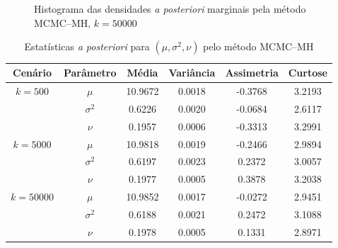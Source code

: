 \documentclass[9pt]{beamer}
\begin{document}
\begin{frame}
\begin{figure}[t]
\caption{Histograma das densidades \textit{a posteriori} marginais pela método MCMC--MH, $k = 50000$}%
\end{figure}
\end{frame}
\begin{frame}
\begin{table}[htb]
\caption{Estatísticas \textit{a posteriori} para $(\mu, \sigma^2, \nu)$ pelo método MCMC--MH}
\label{tab3}
\centering
\begin{tabular}{cccccc}
\toprule
Cenário & Parâmetro & Média & Variância & Assimetria & Curtose \\
\midrule
$k = 500$ & $\mu$ & 10.9672 & 0.0018 & -0.3768 & 3.2193 \\
& $\sigma^2$ & 0.6226 & 0.0020 & -0.0684 & 2.6117 \\
& $\nu$      & 0.1957 & 0.0006 & -0.3313 & 3.2991 \\
\midrule
$k = 5000$ & $\mu$ & 10.9818 & 0.0019 & -0.2466 & 2.9894 \\
& $\sigma^2$ & 0.6197 & 0.0023 & 0.2372 & 3.0057 \\
& $\nu$      & 0.1977 & 0.0005 & 0.3878 & 3.2038 \\
\midrule
$k = 50000$ & $\mu$ & 10.9852 & 0.0017 & -0.0272 & 2.9451 \\
& $\sigma^2$ & 0.6188 & 0.0021 & 0.2472 & 3.1088 \\
& $\nu$      & 0.1978 & 0.0005 & 0.1331 & 2.8971 \\
\bottomrule
\end{tabular}
\end{table}
\end{frame}
\end{document}
